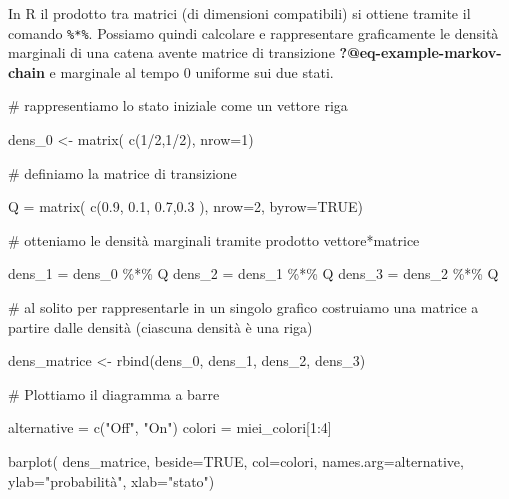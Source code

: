 \documentclass[
  italian,
  letterpaper,
]{book}
\newenvironment{Shaded}{\begin{snugshade}}{\end{snugshade}}
\newcommand{\AttributeTok}[1]{\textcolor[rgb]{0.40,0.45,0.13}{#1}}
\newcommand{\CommentTok}[1]{\textcolor[rgb]{0.37,0.37,0.37}{#1}}
\newcommand{\ConstantTok}[1]{\textcolor[rgb]{0.56,0.35,0.01}{#1}}
\newcommand{\DecValTok}[1]{\textcolor[rgb]{0.68,0.00,0.00}{#1}}
\newcommand{\FloatTok}[1]{\textcolor[rgb]{0.68,0.00,0.00}{#1}}
\newcommand{\FunctionTok}[1]{\textcolor[rgb]{0.28,0.35,0.67}{#1}}
\newcommand{\NormalTok}[1]{\textcolor[rgb]{0.00,0.23,0.31}{#1}}
\newcommand{\OtherTok}[1]{\textcolor[rgb]{0.00,0.23,0.31}{#1}}
\newcommand{\SpecialCharTok}[1]{\textcolor[rgb]{0.37,0.37,0.37}{#1}}
\newcommand{\StringTok}[1]{\textcolor[rgb]{0.13,0.47,0.30}{#1}}
\theoremstyle{definition}
\theoremstyle{remark}
\begin{document}
In R il prodotto tra matrici (di dimensioni compatibili) si ottiene
tramite il comando \texttt{\%*\%}. Possiamo quindi calcolare e
rappresentare graficamente le densità marginali di una catena avente
matrice di transizione \textbf{?@eq-example-markov-chain} e marginale al
tempo \(0\) uniforme sui due stati.

\begin{Shaded}
\begin{Highlighting}[]
\CommentTok{\# rappresentiamo lo stato iniziale  come un vettore riga}

\NormalTok{dens\_0 }\OtherTok{\textless{}{-}} \FunctionTok{matrix}\NormalTok{( }\FunctionTok{c}\NormalTok{(}\DecValTok{1}\SpecialCharTok{/}\DecValTok{2}\NormalTok{,}\DecValTok{1}\SpecialCharTok{/}\DecValTok{2}\NormalTok{), }\AttributeTok{nrow=}\DecValTok{1}\NormalTok{)}

\CommentTok{\# definiamo la matrice di transizione}

\NormalTok{Q }\OtherTok{=} \FunctionTok{matrix}\NormalTok{( }\FunctionTok{c}\NormalTok{(}\FloatTok{0.9}\NormalTok{, }\FloatTok{0.1}\NormalTok{, }\FloatTok{0.7}\NormalTok{,}\FloatTok{0.3}\NormalTok{ ), }\AttributeTok{nrow=}\DecValTok{2}\NormalTok{, }\AttributeTok{byrow=}\ConstantTok{TRUE}\NormalTok{)}

\CommentTok{\# otteniamo le densità marginali tramite prodotto vettore*matrice}

\NormalTok{dens\_1 }\OtherTok{=}\NormalTok{ dens\_0 }\SpecialCharTok{\%*\%}\NormalTok{ Q}
\NormalTok{dens\_2 }\OtherTok{=}\NormalTok{ dens\_1 }\SpecialCharTok{\%*\%}\NormalTok{ Q}
\NormalTok{dens\_3 }\OtherTok{=}\NormalTok{ dens\_2 }\SpecialCharTok{\%*\%}\NormalTok{ Q}

\CommentTok{\# al solito per rappresentarle in un singolo grafico costruiamo una matrice a partire dalle densità (ciascuna densità è una riga)}

\NormalTok{dens\_matrice }\OtherTok{\textless{}{-}} \FunctionTok{rbind}\NormalTok{(dens\_0, dens\_1, dens\_2, dens\_3)}

\CommentTok{\# Plottiamo il diagramma a barre}

\NormalTok{alternative }\OtherTok{=} \FunctionTok{c}\NormalTok{(}\StringTok{"Off"}\NormalTok{, }\StringTok{"On"}\NormalTok{)}
\NormalTok{colori }\OtherTok{=}\NormalTok{ miei\_colori[}\DecValTok{1}\SpecialCharTok{:}\DecValTok{4}\NormalTok{]}

\FunctionTok{barplot}\NormalTok{( dens\_matrice, }\AttributeTok{beside=}\ConstantTok{TRUE}\NormalTok{, }\AttributeTok{col=}\NormalTok{colori, }\AttributeTok{names.arg=}\NormalTok{alternative, }\AttributeTok{ylab=}\StringTok{"probabilità"}\NormalTok{, }\AttributeTok{xlab=}\StringTok{"stato"}\NormalTok{)}


\end{Highlighting}
\end{Shaded}
\end{document}
